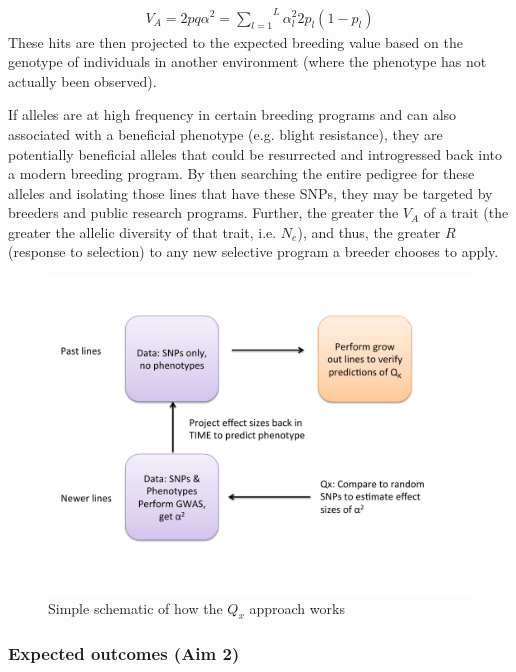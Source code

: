 \documentclass[12pt]{article}
\begin{document}
  \begin{align}
    V_A = 2pq\alpha^2
     = \overset{L}{\underset{l=1}{\sum}}\alpha^2_l2p_l(1-p_l)
  \end{align}
These hits are then projected to the expected breeding value based on the genotype of individuals in another environment (where the phenotype has not actually been observed). 

If alleles are at high frequency in certain breeding programs and can also associated with a beneficial phenotype (e.g. blight resistance), they are potentially beneficial alleles that could be resurrected and introgressed back into a modern breeding program. 
By then searching the entire pedigree for these alleles and isolating those lines that have these SNPs, they may be targeted by breeders and public research programs.
Further, the greater the $V_A$ of a trait (the greater the allelic diversity of that trait, i.e. $N_{e}$), and thus, the greater $R$ (response to selection) to any new selective program a breeder chooses to apply.

\begin{figure}
\includegraphics[width=0.7\linewidth]{Qx.pdf}
\caption{Simple schematic of how the $Q_{x}$ approach works}
\label{fig:qx}
\end{figure}

\subsubsection*{Expected outcomes (Aim 2)}
\end{document}
